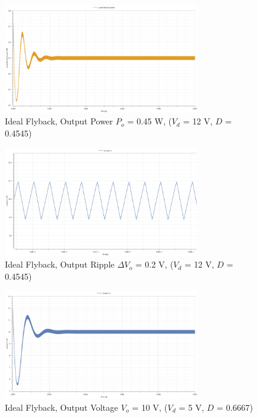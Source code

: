 \documentclass[12pt,twoside]{scrartcl}
\begin{document}
\begin{figure}[htp]
    \centering
    \includegraphics[width=0.75\textwidth]{PowerIdealSim12V.png}
    \caption{Ideal Flyback, Output Power $P_o$ = 0.45 W, ($V_d$ = 12 V, $D$ = 0.4545)}
    \label{fig:PowerIdealSim12V}
\end{figure}

\begin{figure}[htp]
    \centering
    \includegraphics[width=0.75\textwidth]{RippleIdealSim12V.png}
    \caption{Ideal Flyback, Output Ripple $\Delta V_o$ = 0.2 V, ($V_d$ = 12 V, $D$ = 0.4545)}
    \label{fig:RippleIdealSim12V}
\end{figure}
\begin{figure}[htp]
    \centering
    \includegraphics[width=0.75\textwidth]{IdealSim5V.png}
    \caption{Ideal Flyback, Output Voltage $V_o$ = 10 V, ($V_d$ = 5 V, $D$ = 0.6667)}
    \label{fig:IdealSim5V}
\end{figure}
\end{document}
